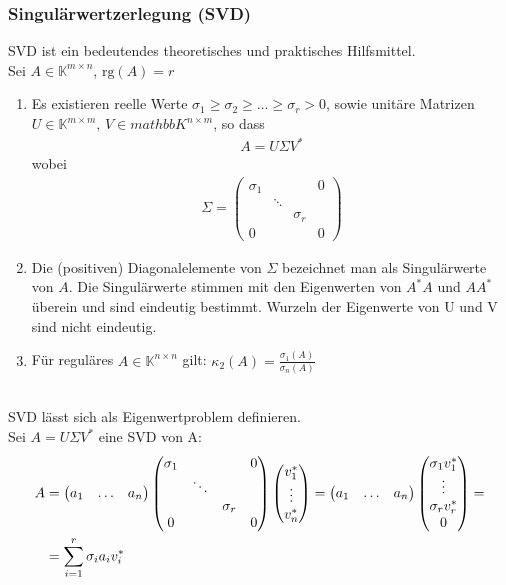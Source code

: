 \subsubsection{Singulärwertzerlegung (SVD)}
SVD ist ein bedeutendes theoretisches und praktisches Hilfsmittel.\\
\satz Sei $A \in \mathbb{K}^{m \times n}$, $\mathrm{rg}(A) = r$\\
\begin{enumerate}
  \item{Es existieren reelle Werte $\sigma_1 \geq \sigma_2 \geq \ldots \geq \sigma_r > 0$, sowie
      unitäre Matrizen $U \in \mathbb{K}^{m \times m}, \, V \in mathbb{K}^{n \times m}$, so dass
      \begin{align*}
        A = U \Sigma V^* \tag{SVD}
      \end{align*}
      wobei
      \begin{align*}
        \Sigma = \begin{pmatrix}
          \sigma_1 &        &          & 0 \\
                   & \ddots &          &   \\
                   &        & \sigma_r &   \\
          0        &        &          & 0
        \end{pmatrix}
      \end{align*}}
  \item{Die (positiven) Diagonalelemente von $\Sigma$ bezeichnet man als Singulärwerte von $A$.
      Die Singulärwerte stimmen mit den Eigenwerten von $A^*A$ und $AA^*$ überein und sind eindeutig
      bestimmt. Wurzeln der Eigenwerte von U und V sind nicht eindeutig.}
    \item Für reguläres $A \in \mathbb{K}^{n \times n}$ gilt: $\kappa_2(A) = \frac{\sigma_1(A)}{\sigma_n(A)}$
\end{enumerate}
\\
SVD lässt sich als Eigenwertproblem definieren.\\
Sei $A = U \Sigma V^*$ eine SVD von A:
\begin{align*}
  A &=\begin{pmatrix} a_1 & \ldots & a_n \end{pmatrix} \begin{pmatrix}
          \sigma_1 &        &          & 0 \\
                   & \ddots &          &   \\
                   &        & \sigma_r &   \\
          0        &        &          & 0
        \end{pmatrix} \begin{pmatrix}
          v_1^* \\ \vdots \\ v_n^* 
        \end{pmatrix}
        = \begin{pmatrix} a_1 & \ldots & a_n \end{pmatrix} \begin{pmatrix} \sigma_1 v_1^* \\ \vdots \\ \sigma_r v_r^* \\ 0 \end{pmatrix} = \\
   &= \sum^{r}_{i=1} \sigma_i a_i v_i^*
\end{align*}
